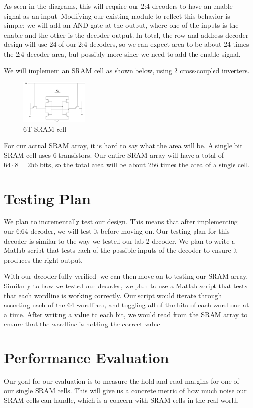 \documentclass{article}
\begin{document}
As seen in the diagrams, this will require our 2:4 decoders to have an enable signal as an input. Modifying our existing module to 
reflect this behavior is simple: we will add an AND gate at the output, where one of the inputs is the enable and the other 
is the decoder output. In total, the row and address decoder design will use 24 of our 2:4 decoders, so we can expect area to be
about 24 times the 2:4 decoder area, but possibly more since we need to add the enable signal.\newline

We will implement an SRAM cell as shown below, using 2 cross-coupled inverters.
\begin{figure}[h]
    \caption{6T SRAM cell}
    \centering
    \includegraphics[width=0.3\textwidth]{sramcell.drawio.png}
\end{figure}

For our actual SRAM array, it is hard to say what the area will be. A single bit SRAM cell uses 6 transistors. Our entire SRAM array
will have a total of $64 \cdot 8 = 256$ bits, so the total area will be about 256 times the area of a single cell.

\section{Testing Plan}
We plan to incrementally test our design. This means that after implementing our 6:64 decoder, we will test it before moving on.
Our testing plan for this decoder is similar to the way we tested our lab 2 decoder. We plan to write a Matlab script that tests
each of the possible inputs of the decoder to ensure it produces the right output.\newline

With our decoder fully verified, we can then move on to testing our SRAM array. Similarly to how we tested our decoder, we plan 
to use a Matlab script that tests that each wordline is working correctly. Our script would iterate through asserting each of
the 64 wordlines, and toggling all of the bits of each word one at a time. After writing a value to each bit, we would read
from the SRAM array to ensure that the wordline is holding the correct value.

\section{Performance Evaluation}
Our goal for our evaluation is to measure the hold and read margins for one of our single SRAM cells. This will give us a 
concrete metric of how much noise our SRAM cells can handle, which is a concern with SRAM cells in the real world.
\end{document}

